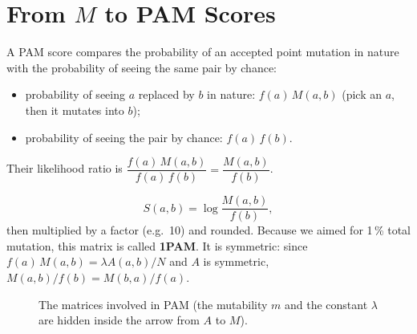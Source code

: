 \documentclass[11pt, oneside]{book}
\let\originalsection\section
\renewcommand{\section}{\Needspace{7\baselineskip}\originalsection}
\begin{document}
\section{From \texorpdfstring{$M$}{M} to PAM Scores}

A PAM score compares the probability of an accepted point mutation in nature
with the probability of seeing the same pair by chance:
\begin{itemize}
  \item probability of seeing $a$ replaced by $b$ in nature: $f(a)\,M(a,b)$
    (pick an $a$, then it mutates into $b$);
  \item probability of seeing the pair by chance: $f(a)\,f(b)$.
\end{itemize}
Their likelihood ratio is $\dfrac{f(a)\,M(a,b)}{f(a)\,f(b)} = \dfrac{M(a,b)}{f(b)}$.

\begin{thmbox}[title={The 1 PAM scoring matrix}]
\[
  S(a,b) = \log \frac{M(a,b)}{f(b)},
\]
then multiplied by a factor (e.g.\ 10) and rounded. Because we aimed for 1\,\%
total mutation, this matrix is called \textbf{1PAM}. It is symmetric: since
$f(a)\,M(a,b) = \lambda A(a,b)/N$ and $A$ is symmetric,
$M(a,b)/f(b) = M(b,a)/f(a)$.
\end{thmbox}

\begin{figure}[htbp]
\centering
{}
\caption{The matrices involved in PAM (the mutability $m$ and the constant
$\lambda$ are hidden inside the arrow from $A$ to $M$).}
\label{fig:pam-recap}
\end{figure}
\end{document}
